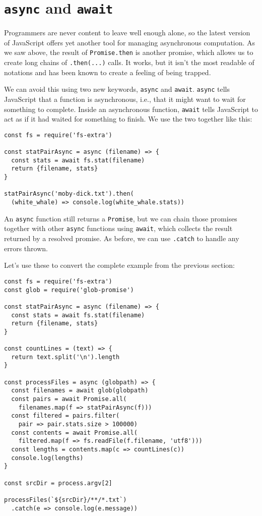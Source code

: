 \hypertarget{s:promises-async-await}{\section{\texorpdfstring{\texttt{async} and \texttt{await}}{async and await}}\label{s:promises-async-await}}

Programmers are never content to leave well enough alone,
so the latest version of JavaScript offers yet another tool for managing asynchronous computation.
As we saw above,
the result of \texttt{Promise.then} is another promise,
which allows us to create long chains of \texttt{.then(...)} calls.
It works,
but it isn't the most readable of notations and has been known to create a feeling of being trapped.

We can avoid this using two new keywords, \texttt{async} and \texttt{await}.
\texttt{async} tells JavaScript that a function is asynchronous,
i.e.,
that it might want to wait for something to complete.
Inside an asynchronous function,
\texttt{await} tells JavaScript to act as if it had waited for something to finish.
We use the two together like this:

\begin{verbatim}
const fs = require('fs-extra')

const statPairAsync = async (filename) => {
  const stats = await fs.stat(filename)
  return {filename, stats}
}

statPairAsync('moby-dick.txt').then(
  (white_whale) => console.log(white_whale.stats))
\end{verbatim}

An \texttt{async} function still returns a \texttt{Promise},
but we can chain those promises together with other \texttt{async} functions using \texttt{await},
which collects the result returned by a resolved promise.
As before, we can use \texttt{.catch} to handle any errors thrown.

Let's use these to convert the complete example from the previous section:

\begin{verbatim}
const fs = require('fs-extra')
const glob = require('glob-promise')

const statPairAsync = async (filename) => {
  const stats = await fs.stat(filename)
  return {filename, stats}
}

const countLines = (text) => {
  return text.split('\n').length
}

const processFiles = async (globpath) => {
  const filenames = await glob(globpath)
  const pairs = await Promise.all(
    filenames.map(f => statPairAsync(f)))
  const filtered = pairs.filter(
    pair => pair.stats.size > 100000)
  const contents = await Promise.all(
    filtered.map(f => fs.readFile(f.filename, 'utf8')))
  const lengths = contents.map(c => countLines(c))
  console.log(lengths)
}

const srcDir = process.argv[2]

processFiles(`${srcDir}/**/*.txt`)
  .catch(e => console.log(e.message))
\end{verbatim}

